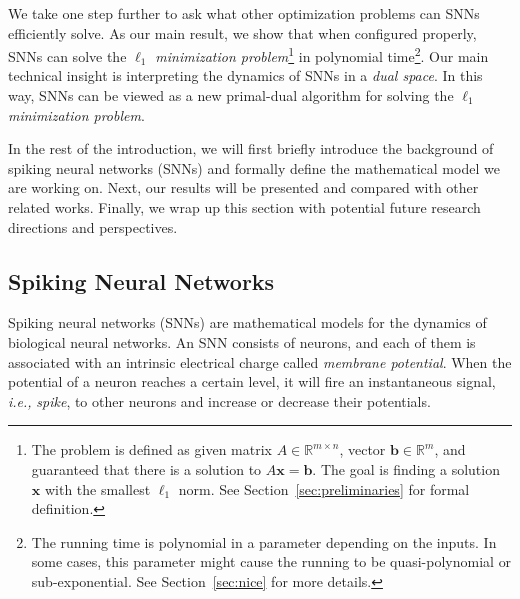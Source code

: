 \documentclass[11pt]{article}
\theoremstyle{remark}
\theoremstyle{definition}
\newcommand{\bx}{\mathbf{x}}
\newcommand{\bb}{\mathbf{b}}
\newcommand{\R}{{\mathbb R}} %
\begin{document}
We take one step further to ask what other optimization problems can SNNs efficiently solve. As our main result, we show that when configured properly, SNNs can solve the \textit{$\ell_1$ minimization problem}\footnote{The problem is defined as given matrix $A\in\R^{m\times n}$, vector $\bb\in\R^m$, and guaranteed that there is a solution to $A\bx=\bb$. The goal is finding a solution $\bx$ with the smallest $\ell_1$ norm. See Section~\ref{sec:preliminaries} for formal definition.} in polynomial time\footnote{The running time is polynomial in a parameter depending on the inputs. In some cases, this parameter might cause the running to be quasi-polynomial or sub-exponential. See Section~\ref{sec:nice} for more details.}. Our main technical insight is interpreting the dynamics of SNNs in a \textit{dual space}. In this way, SNNs can be viewed as a new primal-dual algorithm for solving the \textit{$\ell_1$ minimization problem}. 

In the rest of the introduction, we will first briefly introduce the background of spiking neural networks (SNNs) and formally define the mathematical model we are working on. Next, our results will be presented and compared with other related works. Finally, we wrap up this section with potential future research directions and perspectives.


\subsection{Spiking Neural Networks}\label{sec:intro SNN model}

Spiking neural networks (SNNs) are mathematical models for the dynamics of biological neural networks.
An SNN consists of neurons, and each of them is associated with an intrinsic electrical charge called \textit{membrane potential}. When the potential of a neuron reaches a certain level, it will fire an instantaneous signal, \textit{i.e.,} \textit{spike}, to other neurons and increase or decrease their potentials.
\end{document}
